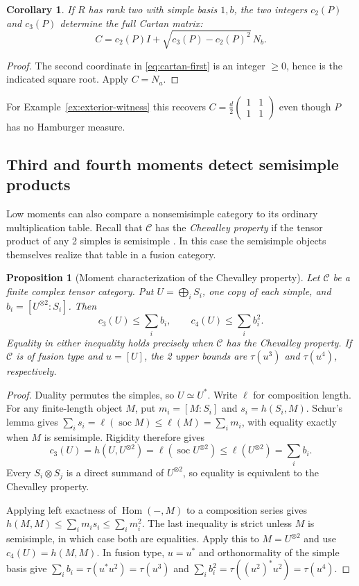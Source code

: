 \documentclass[11pt,reqno]{amsart}
\newtheorem{proposition}[theorem]{Proposition}
\newtheorem{corollary}[theorem]{Corollary}
\theoremstyle{definition}
\newcommand{\Hom}{\operatorname{Hom}}
\newcommand{\C}{\mathcal C}
\begin{document}
\begin{corollary}\label{cor:rank-two-recovery}
If $R$ has rank two with simple basis $1,b$, the two integers $c_2(P)$ and $c_3(P)$ determine the full Cartan matrix:
\[
 C=c_2(P)I+\sqrt{c_3(P)-c_2(P)^2}\,N_b .
\]
\end{corollary}
\begin{proof}
The second coordinate in \eqref{eq:cartan-first} is an integer $\geq0$, hence is the indicated square root. Apply $C=N_a$.
\end{proof}
For Example~\ref{ex:exterior-witness} this recovers $C=\tfrac d2\left(\begin{smallmatrix}1&1\\1&1\end{smallmatrix}\right)$ even though $P$ has no Hamburger measure.

\subsection{Third and fourth moments detect semisimple products}\label{sec:chevalley}
Low moments can also compare a nonsemisimple category to its ordinary multiplication table. Recall that $\C$ has the \emph{Chevalley property} if the tensor product of any 2 simples is semisimple \cite[\S4.12]{EGNO}. In this case the semisimple objects themselves realize that table in a fusion category.

\begin{proposition}[Moment characterization of the Chevalley property]\label{prop:chevalley}\label{prop:chevalley-moments}
Let $\C$ be a finite complex tensor category. Put $U=\bigoplus_iS_i$, one copy of each simple, and $b_i=[U^{\otimes2}:S_i]$. Then
\[
 c_3(U)\le\sum_i b_i,\qquad c_4(U)\le\sum_i b_i^2.
\]
Equality in either inequality holds precisely when $\C$ has the Chevalley property. If $\C$ is of fusion type and $u=[U]$, the 2 upper bounds are $\tau(u^3)$ and $\tau(u^4)$, respectively.
\end{proposition}
\begin{proof}
Duality permutes the simples, so $U\simeq U^*$. Write $\ell$ for composition length. For any finite-length object $M$, put $m_i=[M:S_i]$ and $s_i=h(S_i,M)$. Schur's lemma gives $\sum_i s_i=\ell(\operatorname{soc}M)\le\ell(M)=\sum_i m_i$, with equality exactly when $M$ is semisimple. Rigidity therefore gives
\[
 c_3(U)=h(U,U^{\otimes2})=\ell(\operatorname{soc}U^{\otimes2})
 \le\ell(U^{\otimes2})=\sum_i b_i.
\]
Every $S_i\otimes S_j$ is a direct summand of $U^{\otimes2}$, so equality is equivalent to the Chevalley property.

Applying left exactness of $\Hom(-,M)$ to a composition series gives $h(M,M)\le\sum_i m_i s_i\le\sum_i m_i^2$. The last inequality is strict unless $M$ is semisimple, in which case both are equalities. Apply this to $M=U^{\otimes2}$ and use $c_4(U)=h(M,M)$. In fusion type, $u=u^*$ and orthonormality of the simple basis give $\sum_i b_i=\tau(u^*u^2)=\tau(u^3)$ and $\sum_i b_i^2=\tau((u^2)^*u^2)=\tau(u^4)$.
\end{proof}
\end{document}
